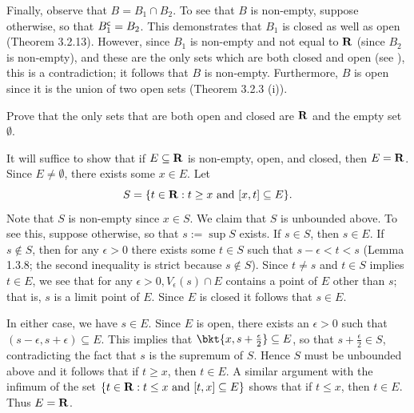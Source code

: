 \documentclass{lew98_solutions}
\begin{document}
\begin{solution}
    Finally, observe that \( B = B_1 \cap B_2 \). To see that \( B \) is non-empty, suppose otherwise, so that \( B_1^{\mathsf{c}} = B_2 \). This demonstrates that \( B_1 \) is closed as well as open (Theorem 3.2.13). However, since \( B_1 \) is non-empty and not equal to \( \mathbf{R} \) (since \( B_2 \) is non-empty), and these are the only sets which are both closed and open (see ), this is a contradiction; it follows that \( B \) is non-empty. Furthermore, \( B \) is open since it is the union of two open sets (Theorem 3.2.3 (i)).
\end{solution}

\begin{exercise}
\label{ex:3.2.13}
    Prove that the only sets that are both open and closed are \( \mathbf{R} \) and the empty set \( \emptyset \).
\end{exercise}

\begin{solution}
    It will suffice to show that if \( E \subseteq \mathbf{R} \) is non-empty, open, and closed, then \( E = \mathbf{R} \). Since \( E \neq \emptyset \), there exists some \( x \in E \). Let
    \[
        S = \{ t \in \mathbf{R} : t \geq x \text{ and } [x, t] \subseteq E \}.
    \]
    Note that \( S \) is non-empty since \( x \in S \). We claim that \( S \) is unbounded above. To see this, suppose otherwise, so that \( s := \sup S \) exists. If \( s \in S \), then \( s \in E \). If \( s \not\in S \), then for any \( \epsilon > 0 \) there exists some \( t \in S \) such that \( s - \epsilon < t < s \) (Lemma 1.3.8; the second inequality is strict because \( s \not\in S \)). Since \( t \neq s \) and \( t \in S \) implies \( t \in E \), we see that for any \( \epsilon > 0, V_{\epsilon}(s) \cap E \) contains a point of \( E \) other than \( s \); that is, \( s \) is a limit point of \( E \). Since \( E \) is closed it follows that \( s \in E \).

    In either case, we have \( s \in E \). Since \( E \) is open, there exists an \( \epsilon > 0 \) such that \( (s - \epsilon, s + \epsilon) \subseteq E \). This implies that \( \bkt{ x, s + \tfrac{\epsilon}{2} } \subseteq E \), so that \( s + \tfrac{\epsilon}{2} \in S \), contradicting the fact that \( s \) is the supremum of \( S \). Hence \( S \) must be unbounded above and it follows that if \( t \geq x \), then \( t \in E \). A similar argument with the infimum of the set \( \{ t \in \mathbf{R} : t \leq x \text{ and } [t, x] \subseteq E \} \) shows that if \( t \leq x \), then \( t \in E \). Thus \( E = \mathbf{R} \).
\end{solution}
\end{document}
